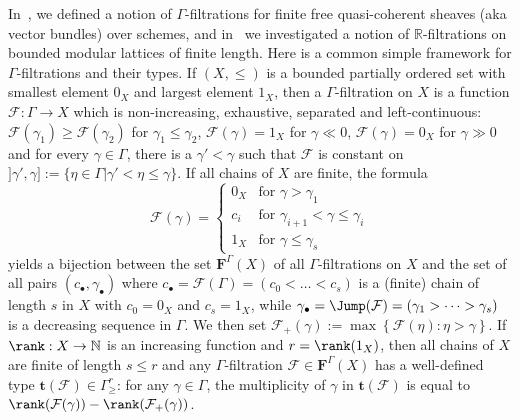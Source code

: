 In~\cite{Co14}, we defined a notion of $\Gamma$-filtrations for finite free quasi-coherent sheaves (aka vector bundles) over schemes, and in~\cite{Co16} we investigated a notion of $\mathbb{R}$-filtrations on bounded modular lattices of finite length. Here is a common simple framework for $\Gamma$-filtrations and their types. If $(X,\leq)$ is a bounded partially ordered set with smallest element $0_{X}$ and largest element $1_{X}$, then a $\Gamma$-filtration on $X$ is a function $\mathcal{F}:\Gamma\rightarrow X$ which is non-increasing, exhaustive, separated and left-continuous: $\mathcal{F}(\gamma_{1})\geq\mathcal{F}(\gamma_{2})$ for $\gamma_{1}\leq\gamma_{2}$, $\mathcal{F}(\gamma)=1_{X}$ for $\gamma\ll0$, $\mathcal{F}(\gamma)=0_{X}$ for $\gamma\gg0$ and for every $\gamma\in\Gamma$, there is a $\gamma'<\gamma$ such that $\mathcal{F}$ is constant on $]\gamma',\gamma]:=\{\eta\in\Gamma\vert\gamma'<\eta\leq\gamma\}$. If all chains of $X$ are finite, the formula
\[
\mathcal{F}(\gamma)=
\begin{cases}
0_{X} & \text{for }\gamma>\gamma_{1}\\
c_{i} & \text{for }\gamma_{i+1}<\gamma\leq\gamma_{i}\\
1_{X} & \text{for }\gamma\leq\gamma_{s}
\end{cases}
\]
yields a bijection between the set $\mathbf{F}^{\Gamma}(X)$ of all $\Gamma$-filtrations on $X$ and the set of all pairs $(c_{\bullet},\gamma_{\bullet})$ where $c_{\bullet}=\mathcal{F}(\Gamma)=(c_{0}<\dots<c_{s})$ is a (finite) chain of length $s$ in $X$ with $c_{0}=0_{X}$ and $c_{s}=1_{X}$, while $\gamma_{\bullet}=\Jump(\mathcal{F})=(\gamma_{1}>\dots>\gamma_{s})$ is a decreasing sequence in $\Gamma$. We then set $\mathcal{F}_{+}(\gamma):=\max\left\{ \mathcal{F}(\eta):\eta>\gamma\right\} $. If $\rank:X\rightarrow\mathbb{N}$ is an increasing function and $r=\rank(1_{X})$, then all chains of $X$ are finite of length $s\leq r$ and any $\Gamma$-filtration $\mathcal{F}\in\mathbf{F}^{\Gamma}(X)$ has a well-defined type $\mathbf{t}(\mathcal{F})\in\Gamma_{\geq}^{r}$: for any $\gamma\in\Gamma$, the multiplicity of $\gamma$ in $\mathbf{t}(\mathcal{F})$ is equal to $\rank(\mathcal{F}(\gamma))-\rank(\mathcal{F}_{+}(\gamma))$.

